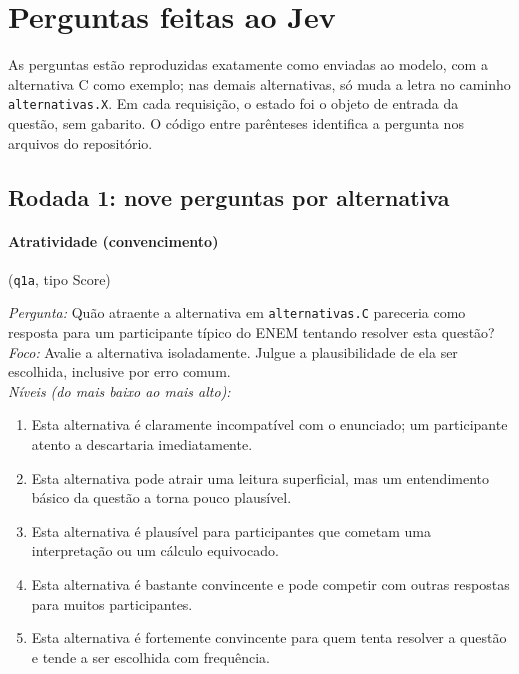 
\section{Perguntas feitas ao Jev}\label{ap:perguntas}

As perguntas estão reproduzidas exatamente como enviadas ao modelo, com a alternativa C como exemplo; nas demais alternativas, só muda a letra no caminho \texttt{alternativas.X}. Em cada requisição, o estado foi o objeto de entrada da questão, sem gabarito. O código entre parênteses identifica a pergunta nos arquivos do repositório.

\subsection{Rodada 1: nove perguntas por alternativa}

\paragraph{Atratividade (convencimento)} (\texttt{q1a}, tipo Score)

\textit{Pergunta:} Quão atraente a alternativa em \texttt{alternativas.C} pareceria como resposta para um participante típico do ENEM tentando resolver esta questão?\\
\textit{Foco:} Avalie a alternativa isoladamente. Julgue a plausibilidade de ela ser escolhida, inclusive por erro comum.\\
\textit{Níveis (do mais baixo ao mais alto):}
\begin{enumerate}[nosep,label=\arabic*.,start=0]
  \item Esta alternativa é claramente incompatível com o enunciado; um participante atento a descartaria imediatamente.
  \item Esta alternativa pode atrair uma leitura superficial, mas um entendimento básico da questão a torna pouco plausível.
  \item Esta alternativa é plausível para participantes que cometam uma interpretação ou um cálculo equivocado.
  \item Esta alternativa é bastante convincente e pode competir com outras respostas para muitos participantes.
  \item Esta alternativa é fortemente convincente para quem tenta resolver a questão e tende a ser escolhida com frequência.
\end{enumerate}

